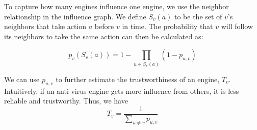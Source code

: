 To capture how many engines influence one engine, we use the neighbor relationship in the influence graph. 
We define $S_v(a)$ to be the set of $v$'s neighbors that take action $a$ before $v$ in time. 
The probability that $v$ will follow its neighbors to take the same action can then be calculated as:


\begin{equation} \label{eq:setp}
p_v(S_v(a)) = 1 - \prod\limits_{u \in S_v(a)}(1 - p_{u,v})
\end{equation}


We can use $p_{u,v}$ to further estimate the trustworthiness of an engine, $T_v$.
Intuitively, if an anti-virus engine gets more influence from others,
it is less reliable and trustworthy. Thus, we have
\vspace{-0.05in}
\begin{equation} \label{eq:trust}
T_v = \frac{1}{\sum\limits_{u \neq v}{p_{u,v}}}
\end{equation}

